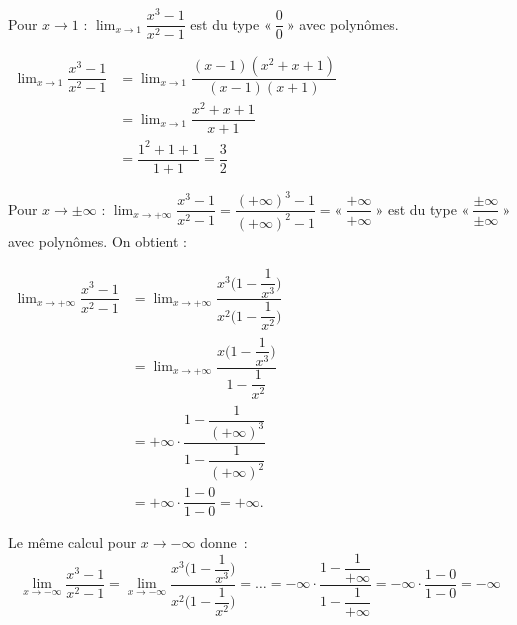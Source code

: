 \documentclass[a4paper,12pt]{article}
\begin{document}
\begin{exemplesuite}
	\tcblower
Pour $x\to 1$ : $\displaystyle\lim_{x\to 1}\dfrac{x^3-1}{x^2-1}$ est du type $«~\displaystyle\dfrac{0}{0}~»$ avec polynômes.
\medskip

$\begin{aligned}
\displaystyle\lim_{x\to 1}\dfrac{x^3-1}{x^2-1}
&=\displaystyle\lim_{x\to 1}\dfrac{(x-1)(x^2+x+1)}{(x-1)(x+1)}\\
&=\displaystyle\lim_{x\to 1}\dfrac{x^2+x+1}{x+1}\\
&=\dfrac{1^2+1+1}{1+1}=\dfrac{3}{2}
\end{aligned}$

\medskip
Pour $x\to \pm\infty$ :
\medskip
$
\displaystyle\lim_{x\to +\infty}\dfrac{x^3-1}{x^2-1}
=\dfrac{(+\infty)^3-1}{(+\infty)^2-1}
=«~\dfrac{+\infty}{+\infty}~»$ est du type $«~\dfrac{\pm\infty}{\pm\infty}~»$ avec polynômes. On obtient :

$\begin{aligned}
\displaystyle\lim_{x\to +\infty}\dfrac{x^3-1}{x^2-1}
&=\displaystyle\lim_{x\to +\infty}\dfrac{x^3\bigl(1-\dfrac{1}{x^3}\bigr)}{x^2\bigl(1-\dfrac{1}{x^2}\bigr)}\\
&=\displaystyle\lim_{x\to +\infty}\dfrac{x\bigl(1-\dfrac{1}{x^3}\bigr)}{1-\dfrac{1}{x^2}}\\
&=+\infty\cdot\dfrac{1-\dfrac{1}{(+\infty)^3}}{1-\dfrac{1}{(+\infty)^2}}\\
&=+\infty\cdot\dfrac{1-0}{1-0}=+\infty.
\end{aligned}$
\medskip

Le même calcul pour $x\to -\infty$ donne~:
\[
\displaystyle\lim_{x\to-\infty}\dfrac{x^3-1}{x^2-1}
=\displaystyle\lim_{x\to-\infty}\dfrac{x^3\bigl(1-\dfrac{1}{x^3}\bigr)}{x^2\bigl(1-\dfrac{1}{x^2}\bigr)}
=\dots
=-\infty\cdot\dfrac{1-\dfrac{1}{+\infty}}{1-\dfrac{1}{+\infty}}
=-\infty\cdot\dfrac{1-0}{1-0}
=-\infty
\]


\end{exemplesuite}
\end{document}
